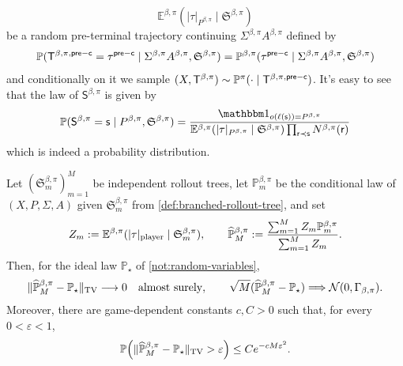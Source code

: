 \documentclass[12pt, a4paper]{article}
\begin{document}
\begin{definition}
\[       {\mathbb{E}^{\beta, \pi}(|\tau|_{P^{\beta,\pi}} \mid \mathfrak{S}^{\beta, \pi})}
\]
be a random pre-terminal trajectory continuing $\Sigma^{\beta, \pi} A^{\beta, \pi}$ defined by
\begin{equation}\label{eq:branched-continuation-law}
  \mathbb{P}(\mathsf{T}^{\beta, \pi,\mathsf{pre-c}} = \tau^{\mathsf{pre-c}} \mid \Sigma^{\beta, \pi} A^{\beta, \pi}, \mathfrak{S}^{\beta, \pi})
  = \mathbb{P}^{\beta, \pi}(\tau^{\mathsf{pre-c}} \mid \Sigma^{\beta, \pi} A^{\beta, \pi}, \mathfrak{S}^{\beta, \pi})
\end{equation} 
and conditionally on it we sample $(X,\mathsf{T}^{\beta,\pi})\sim\mathbb{P}^\pi(\cdot \mid \mathsf{T}^{\beta, \pi, \mathsf{pre-c}})$.
It's easy to see that the law of $\mathsf{S}^{\beta, \pi}$ is given by
\begin{equation}\label{eq:branched-stationary-node-law}
  \mathbb{P}(\mathsf{S}^{\beta,\pi} = \mathsf{s} \mid P^{\beta, \pi}, \mathfrak{S}^{\beta, \pi})
  = \frac{\one_{o(\ell(\mathsf{s})) = P^{\beta, \pi}}}
         {\mathbb{E}^{\beta, \pi}(|\tau|_{P^{\beta, \pi}} \mid \mathfrak{S}^{\beta, \pi}) \prod_{\mathsf{r} \prec \mathsf{s}} N^{\beta,\pi}(\mathsf{r})}
\end{equation}
which is indeed a probability distribution.
\end{definition}

\begin{lemma}\label{lem:branched-decision-law-convergence}
Let $(\mathfrak S_m^{\beta,\pi})_{m=1}^M$ be independent rollout trees, let $\mathbb P_m^{\beta,\pi}$ be the conditional law of $(X,P,\Sigma,A)$ given $\mathfrak S_m^{\beta,\pi}$ from \cref{def:branched-rollout-tree}, and set
\[
  Z_m:=\mathbb E^{\beta,\pi}(|\tau|_{\textnormal{player}}\mid\mathfrak S_m^{\beta,\pi}),
  \qquad
  \widehat{\mathbb P}^{\beta,\pi}_M
  :=\frac{\sum_{m=1}^M Z_m\mathbb P_m^{\beta,\pi}}{\sum_{m=1}^M Z_m}.
\]
Then, for the ideal law $\mathbb P_\star$ of \autoref{not:random-variables},
\[
  \|\widehat{\mathbb P}^{\beta,\pi}_M-\mathbb P_\star\|_{\rm TV}\longrightarrow0
  \quad\textnormal{almost surely},
  \qquad
  \sqrt M(\widehat{\mathbb P}^{\beta,\pi}_M-\mathbb P_\star)
  \Longrightarrow\mathcal N(0,\Gamma_{\beta,\pi}).
\]
Moreover, there are game-dependent constants $c,C>0$ such that, for every $0<\varepsilon<1$,
\[
  \mathbb P\!\left(\|\widehat{\mathbb P}^{\beta,\pi}_M-\mathbb P_\star\|_{\rm TV}>\varepsilon\right)
  \leq Ce^{-cM\varepsilon^2}.
\]
\end{lemma}
\end{document}
